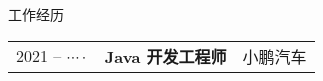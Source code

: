 \begin{rubric}{工作经历}
	\begin{tabular}{@{}p{3cm}p{4cm}p{6cm}@{}}
		2021 -- $\cdots\cdot$ & \textbf{Java 开发工程师} & 小鹏汽车
	\end{tabular}
%
%
\end{rubric}